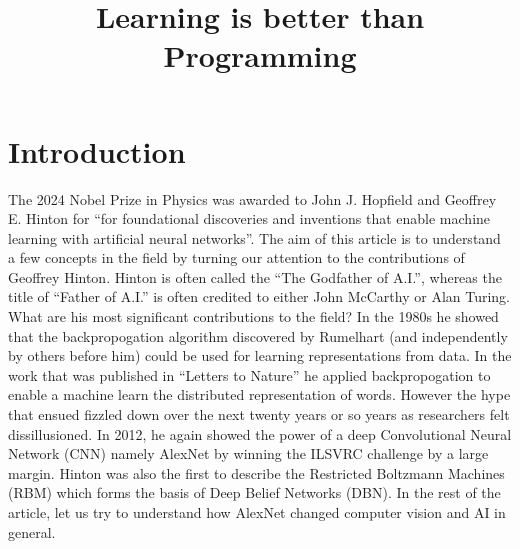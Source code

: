 \documentclass{../template/texnote}
\title{\textbf{Learning is better than Programming}}[author={Linn Abraham}]
\begin{document}
    \maketitle {}
\section{Introduction}
The 2024 Nobel Prize in Physics was awarded to John J. Hopfield and Geoffrey E. Hinton for ``for foundational discoveries and inventions that enable machine learning with artificial neural networks''.
The aim of this article is to understand a few concepts in the field by turning our attention to the contributions of Geoffrey Hinton.
Hinton is often called the ``The Godfather of A.I.'', whereas the title of ``Father of A.I.'' is often credited to either John McCarthy or Alan Turing.
What are his most significant contributions to the field?
In the 1980s he showed that the backpropogation algorithm discovered by Rumelhart (and independently by others before him) could be used for learning representations from data.
In the work that was published in ``Letters to Nature'' he applied backpropogation to enable a machine learn the distributed representation of words.
However the hype that ensued fizzled down over the next twenty years or so years as researchers felt dissillusioned.
In 2012, he again showed the power of a deep Convolutional Neural Network (CNN) namely AlexNet by winning the ILSVRC challenge by a large margin.
Hinton was also the first to describe the Restricted Boltzmann Machines (RBM) which forms the basis of Deep Belief Networks (DBN).
In the rest of the article, let us try to understand how AlexNet changed computer vision and AI in general.
\end{document}

